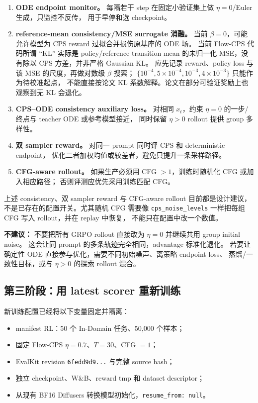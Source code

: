 \documentclass[11pt,a4paper]{article}
\newcommand{\code}[1]{\texttt{#1}}
\newcommand{\warnbox}[1]{%
  \noindent\colorbox{WanLightOrange}{%
    \parbox{\dimexpr\textwidth-2\fboxsep\relax}{\textcolor{WanOrange}{#1}}%
  }%
}
\begin{document}
\begin{enumerate}
  \item \textbf{ODE endpoint monitor。}
  每隔若干 step 在固定小验证集上做 $\eta=0$/Euler 生成，只监控不反传，
  用于早停和选 checkpoint。
  \item \textbf{reference-mean consistency/MSE surrogate 消融。}
  当前 $\beta=0$，可能允许模型为 CPS reward 过拟合并损伤原基座的 ODE 场。
  当前 Flow-CPS 代码所谓 ``KL'' 实际是 policy/reference transition mean
  的未归一化 MSE，没有除以 CPS 方差，并非严格 Gaussian KL。
  应先记录 reward、policy loss 与该 MSE 的尺度，再做对数级 $\beta$ 搜索；
  $\{10^{-4},5\times10^{-4},10^{-3},4\times10^{-3}\}$ 只能作为待校准起点，
  不能直接按论文 KL 系数解释。论文在部分可验证奖励上也观察到无 KL 会退化。
  \item \textbf{CPS--ODE consistency auxiliary loss。}
  对相同 $x_t$，约束 $\eta=0$ 的一步/终点与 teacher ODE 或参考模型接近，
  同时保留 $\eta>0$ rollout 提供 group 多样性。
  \item \textbf{双 sampler reward。}
  对同一 prompt 同时评 CPS 和 deterministic endpoint，
  优化二者加权均值或较差者，避免只提升一条采样路径。
  \item \textbf{CFG-aware rollout。}
  如果生产必须用 CFG $>1$，训练时随机化 CFG 或加入相应路径；
  否则评测应优先采用训练匹配 CFG。
\end{enumerate}

上述 consistency、双 sampler reward 与 CFG-aware rollout
目前都是设计建议，不是已存在的配置开关。尤其随机 CFG 需要像
\code{cps\_noise\_levels} 一样把每组 CFG 写入 rollout，并在 replay 中恢复，
不能只在配置中改一个数值。

\warnbox{\textbf{不建议：}
不要把所有 GRPO rollout 直接改为 $\eta=0$ 并继续共用 group initial noise。
这会让同 prompt 的多条轨迹完全相同，advantage 标准化退化。
若要让确定性 ODE 直接参与优化，需要不同初始噪声、离策略 endpoint loss、
蒸馏/一致性目标，或与 $\eta>0$ 的探索 rollout 混合。}

\subsection{第三阶段：用 latest scorer 重新训练}

新训练配置已经将以下变量固定并隔离：

\begin{itemize}
  \item manifest RL：50 个 In-Domain 任务、50,000 个样本；
  \item 固定 Flow-CPS $\eta=0.7$、$T=30$、CFG $=1$；
  \item EvalKit revision \code{6fedd9d9...} 与完整 source hash；
  \item 独立 checkpoint、W\&B、reward tmp 和 dataset descriptor；
  \item 从现有 BF16 Diffusers 转换模型初始化，\code{resume\_from: null}。
\end{itemize}
\end{document}
